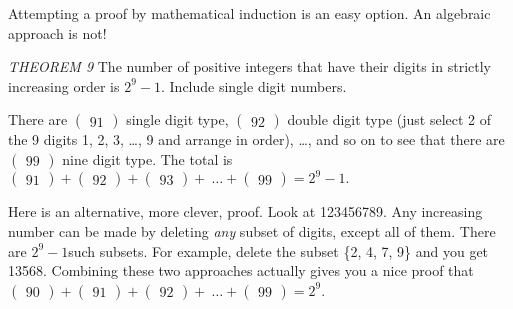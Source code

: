 \documentclass[10pt,letter]{article}
\begin{document}
Attempting a proof by mathematical induction is an easy option. An
algebraic approach is not!

\emph{THEOREM 9} The number of positive integers that have their digits
in strictly increasing order is \(2^{9} - 1\). Include single digit
numbers.

There are \(

\begin{pmatrix}
9 
1 
\end{pmatrix}
\) single digit type, \(

\begin{pmatrix}
9 
2 
\end{pmatrix}
\) double digit type (just select 2 of the 9 digits 1, 2,
3, \ldots{}, 9 and arrange in order), \ldots{}, and so on to see that
there are \(

\begin{pmatrix}
9 
9 
\end{pmatrix}
\) nine digit type. The total is \(

\begin{pmatrix}
9 
1 
\end{pmatrix}
 +

\begin{pmatrix}
9 
2 
\end{pmatrix}
 +

\begin{pmatrix}
9 
3 
\end{pmatrix}
 + \ \ldots +

\begin{pmatrix}
9 
9 
\end{pmatrix}
 = 2^{9} - 1.\)

Here is an alternative, more clever, proof. Look at 123456789. Any
increasing number can be made by deleting \emph{any} subset of digits,
except all of them. There are \(2^{9} - 1\)such subsets. For example,
delete the subset \{2, 4, 7, 9\} and you get 13568. Combining these two
approaches actually gives you a nice proof that \(

\begin{pmatrix}
9 
0 
\end{pmatrix}
 +

\begin{pmatrix}
9 
1 
\end{pmatrix}
 +

\begin{pmatrix}
9 
2 
\end{pmatrix}
 + \ \ldots +

\begin{pmatrix}
9 
9 
\end{pmatrix}
 = 2^{9}\).
\end{document}

